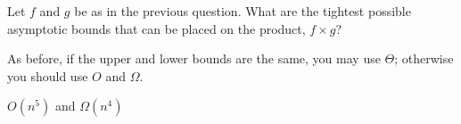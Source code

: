 \begin{prob}
    Let $f$ and $g$ be as in the previous question. What are the tightest possible
    asymptotic bounds that can be placed on the product, $f \times g$?

    As before, if the upper and lower bounds are the same, you may use $\Theta$; otherwise
    you should use $O$ and $\Omega$.

    \begin{soln}
        $O(n^5)$ and $\Omega(n^4)$
    \end{soln}

\end{prob}

